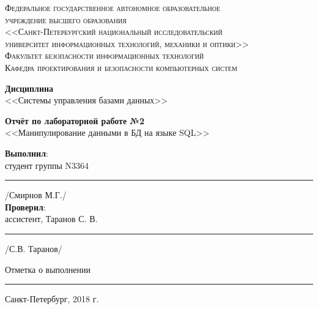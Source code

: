 \begin{titlepage}
	\begin{center}
		\textsc{
			\fontsize{12pt}{14pt}\selectfont
			Федеральное государственное автономное образовательное\\
			учреждение высшего образования\\
			<<Санкт-Петербургский национальный исследовательский\\
			университет информационных технологий, механики и оптики>>\\
			Факультет безопасности информационных технологий\\
			Кафедра проектирования и безопасности компьютерных систем\\}
		
		\vfill
		
		\textbf{Дисциплина}\\
		<<Системы управления базами данных>>\\
		
		\vfill
		
		\textbf{Отчёт по лабораторной работе №2}\\
		<<Манипулирование данными в БД на языке SQL>>\\

	\end{center}

	\vfill
	
	\begin{flushright}
	\textbf{Выполнил}: \\
	студент группы N3364\\
	\rule{10em}{.1pt} /Смирнов М.Г./\\
	\vfill
	\textbf{Проверил}:\\
	ассистент, Таранов С. В.\\

	\rule{10em}{.1pt} /С.В. Таранов/\\
	
	\vfill
	
	Отметка о выполнении \rule{10em}{.1pt}
	
	
		


	\end{flushright}
	\vfill
	\begin{center}
		Санкт-Петербург, 2018 г.
	\end{center}
\end{titlepage}
